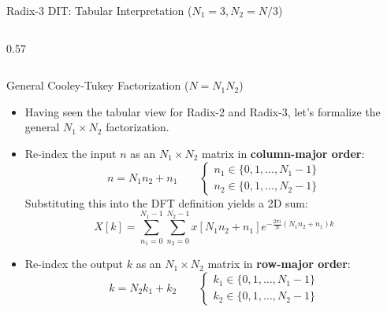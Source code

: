 \begin{frame}{Radix-3 DIT: Tabular Interpretation ($N_1=3, N_2=N/3$)}
\begin{columns}[T]
\begin{column}{0.57\textwidth}
{
            }
        \end{column}
    \end{columns}
\end{frame}

\begin{frame}{General Cooley-Tukey Factorization ($N = N_1 N_2$)}
    \begin{itemize}
        \item Having seen the tabular view for Radix-2 and Radix-3, let's formalize the general $N_1 \times N_2$ factorization.
        \item Re-index the input $n$ as an $N_1 \times N_2$ matrix in \textbf{column-major order}:
              \begin{equation*}
                  n = N_1 n_2 + n_1 \qquad \begin{cases} n_1 \in \{0, 1, \dots, N_1-1\} \\ n_2 \in \{0, 1, \dots, N_2-1\} \end{cases}
              \end{equation*}
              Substituting this into the DFT definition yields a 2D sum:
              \begin{equation*}
                  X[k] = \sum_{n_1=0}^{N_1-1} \sum_{n_2=0}^{N_2-1} x[{N_1 n_2 + n_1}] e^{-\frac{2\pi i}{N} (N_1 n_2 + n_1)k}
              \end{equation*}
        \item Re-index the output $k$ as an $N_1 \times N_2$ matrix in \textbf{row-major order}:
              \begin{equation*}
                  k = N_2 k_1 + k_2 \qquad \begin{cases} k_1 \in \{0, 1, \dots, N_1-1\} \\ k_2 \in \{0, 1, \dots, N_2-1\} \end{cases}
              \end{equation*}
    \end{itemize}
\end{frame}

